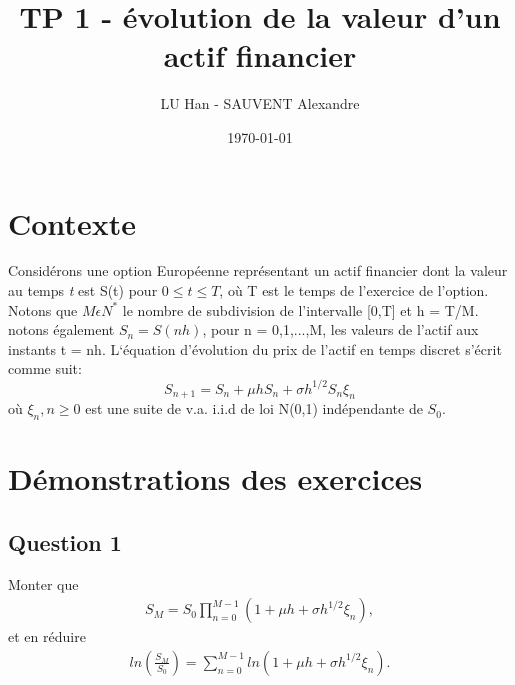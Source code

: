 \documentclass[a4paper,10pt]{report}
\title{TP 1 - évolution de la valeur d'un actif financier}
\author{LU Han - SAUVENT Alexandre}
\date{\today}
\begin{document}
\renewcommand{\labelitemi}{\large\textcolor{tatoebagreen}{\fg}}
\groovypdtitre
\restoregeometry %


\tableofcontents


\chapter{Contexte}
\noindent Considérons une option Européenne représentant un actif financier dont la valeur au temps \emph{t} est S(t) pour $0 \leq t \leq T$, où T est le temps de l'exercice de l'option. Notons que $M \epsilon N^{\ast}$ le nombre de subdivision de l'intervalle [0,T] et h = T/M. notons également $S_{n} = S(nh)$, pour n = 0,1,...,M, les valeurs de l'actif aux instants t = nh.
L‘équation d'évolution du prix de l'actif en temps discret s'écrit comme suit:
\begin{equation}
S_{n+1} = S_{n} + \mu h S_{n} + \sigma h^{1/2} S_{n} \xi_{n}   
\end{equation} 
où $\xi_{n}, n \geq 0$ est une suite de v.a. i.i.d de loi N(0,1) indépendante de $S_{0}$. 

\chapter{Démonstrations des exercices}
\section{Question 1}
\noindent Monter que 
\begin{align*}
	S_{M} = S_{0} \prod_{n=0}^{M-1} (1 + \mu h + \sigma h^{1/2} \xi_{n}),
\end{align*}
\noindent et en réduire
\begin{align*}
	ln(\frac{S_{M}}{S_{0}}) = \sum_{n=0}^{M-1} ln(1  + \mu h + \sigma h^{1/2} \xi_{n}).
\end{align*}
\end{document}
